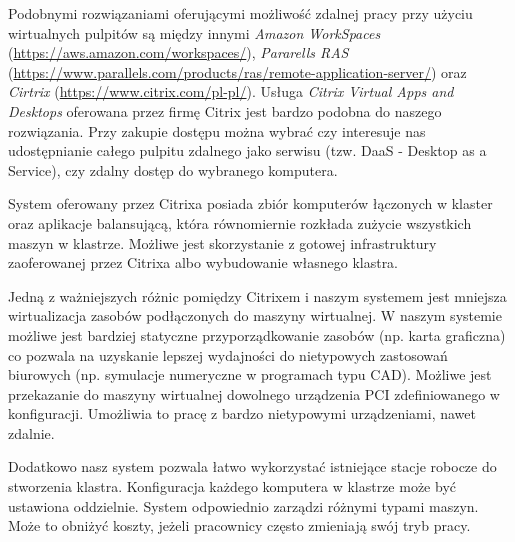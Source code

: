 \documentclass[../wstep.tex]{subfiles}
\begin{document}
Podobnymi rozwiązaniami oferującymi możliwość zdalnej pracy przy użyciu wirtualnych pulpitów są między innymi \textit{Amazon WorkSpaces} (\url{https://aws.amazon.com/workspaces/}), \textit{Pararells RAS} (\url {https://www.parallels.com/products/ras/remote-application-server/}) oraz \textit{Cirtrix} (\url{https://www.citrix.com/pl-pl/}).
Usługa \textit{Citrix Virtual Apps and Desktops} \parencite{citrix-daas} oferowana przez firmę Citrix jest bardzo podobna do naszego rozwiązania.
Przy zakupie dostępu można wybrać czy interesuje nas udostępnianie całego pulpitu zdalnego jako serwisu (tzw. DaaS - Desktop as a Service), czy zdalny dostęp do wybranego komputera.

System oferowany przez Citrixa posiada zbiór komputerów łączonych w klaster oraz aplikacje balansującą, która równomiernie rozkłada zużycie wszystkich maszyn w klastrze.
Możliwe jest skorzystanie z gotowej infrastruktury zaoferowanej przez Citrixa albo wybudowanie własnego klastra.

Jedną z ważniejszych różnic pomiędzy Citrixem i naszym systemem jest mniejsza wirtualizacja zasobów podłączonych do maszyny wirtualnej.
W naszym systemie możliwe jest bardziej statyczne przyporządkowanie zasobów (np. karta graficzna) co pozwala na uzyskanie lepszej wydajności do nietypowych zastosowań biurowych (np. symulacje numeryczne w programach typu CAD).
Możliwe jest przekazanie do maszyny wirtualnej dowolnego urządzenia PCI zdefiniowanego w konfiguracji.
Umożliwia to pracę z bardzo nietypowymi urządzeniami, nawet zdalnie.

Dodatkowo nasz system pozwala łatwo wykorzystać istniejące stacje robocze do stworzenia klastra.
Konfiguracja każdego komputera w klastrze może być ustawiona oddzielnie. System odpowiednio zarządzi różnymi typami maszyn.
Może to obniżyć koszty, jeżeli pracownicy często zmieniają swój tryb pracy.
\end{document}
